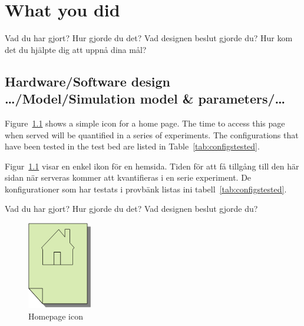 \chapter{What you did}
\label{ch:whatYouDid}

\begin{swedishnotes}
Vad du har gjort? Hur gjorde du det? Vad designen beslut gjorde du?
Hur kom det du hjälpte dig att uppnå dina mål?
\end{swedishnotes}

\section{Hardware/Software design …/Model/Simulation model \& parameters/…}

Figure~\ref{fig:homepageicon} shows a simple icon for a home page. The time
to access this page when served will be quantified in a series of
experiments. The configurations that have been tested in the test bed are
listed in Table~\ref{tab:configstested}.

\begin{swedishnotes}
Figur~\ref{fig:homepageicon}  visar en enkel ikon för en hemsida. Tiden för att få tillgång till den här sidan när serveras kommer att kvantifieras i en serie experiment. De konfigurationer som har testats i provbänk listas ini tabell~\ref{tab:configstested}.

Vad du har gjort? Hur gjorde du det? Vad designen beslut gjorde du?
\end{swedishnotes}
 
\begin{figure}[!ht]
  \begin{center}
    \includegraphics[width=0.25\textwidth]{images/Homepage-icon.png}
  \end{center}
  \caption{Homepage icon}
  \label{fig:homepageicon}
\end{figure}

